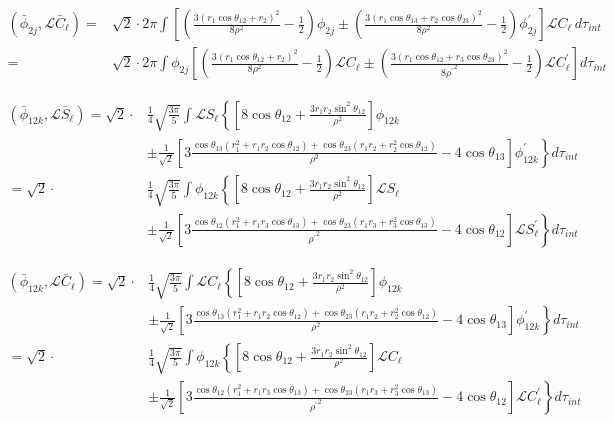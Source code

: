 \documentclass[Dissertation.tex]{subfiles}
\begin{document}
\begin{align}
\label{eq:DWavePhi2CBar}
\nonumber \left(\bar{\phi}_{2j},\mathcal{L} \bar{C}_\ell\right) = & \sqrt{2} \cdot 2\pi \int \left[ \left( \frac{3(r_1 \cos\theta_{12} + r_2)^2}{8 \rho^2} - \frac{1}{2} \right) \phi_{2j} \pm \left( \frac{3(r_1 \cos\theta_{13} + r_2 \cos\theta_{23})^2}{8 \rho^2} - \frac{1}{2} \right) \phi_{2j}^\prime \right] \mathscr{L}C_\ell \, d\tau_{int} \\
=& \sqrt{2} \cdot 2\pi \int \phi_{2j} \left[ \left( \frac{3(r_1 \cos\theta_{12} + r_2)^2}{8 \rho^2} - \frac{1}{2} \right) \mathscr{L}C_\ell \pm \left( \frac{3(r_1 \cos\theta_{12} + r_3 \cos\theta_{23})^2}{8 {\rho^\prime}^2} - \frac{1}{2} \right) \mathscr{L}C_\ell^\prime \right] d\tau_{int}
\end{align}

\begin{align}
\label{eq:DWavePhi3SBar}
\nonumber \left(\bar{\phi}_{12k},\mathcal{L} \bar{S}_\ell\right) = \sqrt{2} \cdot & \frac{1}{4} \sqrt{\frac{3\pi}{5}} \int \mathscr{L}S_\ell \left\{ \left[ 8 \cos\theta_{12} + \frac{3 r_1 r_2 \sin^2\theta_{12}}{\rho^2} \right] \phi_{12k} \right. \\
\nonumber & \left. \pm \frac{1}{\sqrt{2}} \left[ 3 \frac{\cos\theta_{13}(r_1^2 + r_1 r_2 \cos\theta_{12}) + \cos\theta_{23}(r_1 r_2 + r_2^2 \cos\theta_{12})}{\rho^2} - 4 \cos\theta_{13} \right] \phi_{12k}^\prime  \right\} d\tau_{int} \\
\nonumber = \sqrt{2} \cdot & \frac{1}{4} \sqrt{\frac{3\pi}{5}} \int \phi_{12k} \left\{ \left[ 8 \cos\theta_{12} + \frac{3 r_1 r_2 \sin^2\theta_{12}}{\rho^2} \right] \mathscr{L}S_\ell \right. \\
& \pm \left. \frac{1}{\sqrt{2}} \left[ 3 \frac{\cos\theta_{12}(r_1^2 + r_1 r_3 \cos\theta_{13}) + \cos\theta_{23}(r_1 r_3 + r_3^2 \cos\theta_{13})}{{\rho^\prime}^2} - 4 \cos\theta_{12} \right] \mathscr{L}S_\ell^\prime \right\} d\tau_{int}
\end{align}

\begin{align}
\label{eq:DWavePhi3CBar}
\nonumber \left(\bar{\phi}_{12k},\mathcal{L} \bar{C}_\ell\right) = \sqrt{2} \cdot & \frac{1}{4} \sqrt{\frac{3\pi}{5}} \int \mathscr{L}C_\ell \left\{ \left[ 8 \cos\theta_{12} + \frac{3 r_1 r_2 \sin^2\theta_{12}}{\rho^2} \right] \phi_{12k} \right. \\
\nonumber & \left. \pm \frac{1}{\sqrt{2}} \left[ 3 \frac{\cos\theta_{13}(r_1^2 + r_1 r_2 \cos\theta_{12}) + \cos\theta_{23}(r_1 r_2 + r_2^2 \cos\theta_{12})}{\rho^2} - 4 \cos\theta_{13} \right] \phi_{12k}^\prime  \right\} d\tau_{int} \\
\nonumber = \sqrt{2} \cdot & \frac{1}{4} \sqrt{\frac{3\pi}{5}} \int \phi_{12k} \left\{ \left[ 8 \cos\theta_{12} + \frac{3 r_1 r_2 \sin^2\theta_{12}}{\rho^2} \right] \mathscr{L}C_\ell \right. \\
& \pm \left. \frac{1}{\sqrt{2}} \left[ 3 \frac{\cos\theta_{12}(r_1^2 + r_1 r_3 \cos\theta_{13}) + \cos\theta_{23}(r_1 r_3 + r_3^2 \cos\theta_{13})}{{\rho^\prime}^2} - 4 \cos\theta_{12} \right] \mathscr{L}C_\ell^\prime \right\} d\tau_{int}
\end{align}
\end{document}
